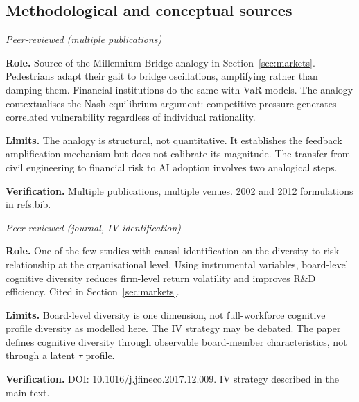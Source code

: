 \documentclass[11pt,a4paper]{article}
\begin{document}
\begin{appendices}
\begin{description}[style=nextline, leftmargin=0pt, labelindent=0pt]
\end{description}

\subsection{Methodological and conceptual
sources}\label{app:bib:conceptual}

\begin{description}[style=nextline, leftmargin=0pt, labelindent=0pt]

\item[\cite{danielsson_endogenous_2012} --- Danielsson \& Shin (2002, 2012).]
\hfill\textit{Peer-reviewed (multiple publications)}

\textbf{Role.}
Source of the Millennium Bridge analogy in Section~\ref{sec:markets}.
Pedestrians adapt their gait to bridge oscillations, amplifying rather than
damping them. Financial institutions do the same with VaR models. The analogy
contextualises the Nash equilibrium argument: competitive pressure generates
correlated vulnerability regardless of individual rationality.

\textbf{Limits.}
The analogy is structural, not quantitative. It establishes the feedback
amplification mechanism but does not calibrate its magnitude. The transfer
from civil engineering to financial risk to AI adoption involves two
analogical steps.

\textbf{Verification.}
Multiple publications, multiple venues. 2002 and 2012 formulations in
refs.bib.

\item[\cite{bernile_jfe_2018} --- Bernile, Bhagwat \& Yonker (2018),
J.~Financial Economics.]
\hfill\textit{Peer-reviewed (journal, IV identification)}

\textbf{Role.}
One of the few studies with causal identification on the diversity-to-risk
relationship at the organisational level. Using instrumental variables,
board-level cognitive diversity reduces firm-level return volatility and
improves R\&D efficiency. Cited in Section~\ref{sec:markets}.

\textbf{Limits.}
Board-level diversity is one dimension, not full-workforce cognitive profile
diversity as modelled here. The IV strategy may be debated. The paper defines
cognitive diversity through observable board-member characteristics, not
through a latent $\tau$ profile.

\textbf{Verification.}
DOI: 10.1016/j.jfineco.2017.12.009. IV strategy described in the main text.


\end{description}
\end{appendices}
\end{document}
